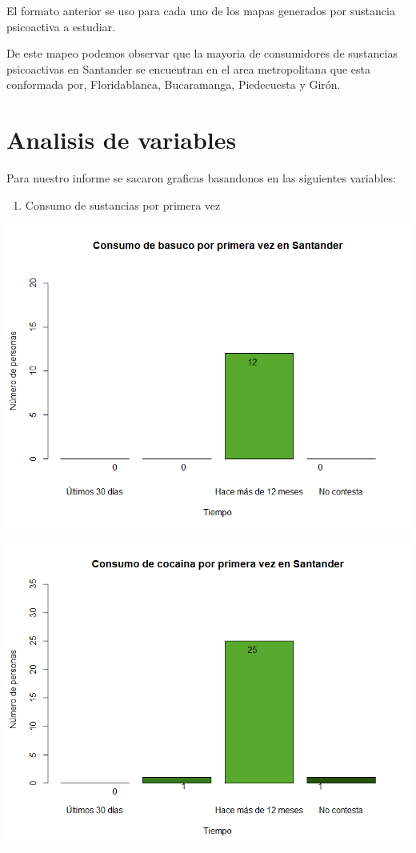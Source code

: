 \documentclass[
]{article}
\providecommand{\tightlist}{%
  \setlength{\itemsep}{0pt}\setlength{\parskip}{0pt}}
\begin{document}
El formato anterior se uso para cada uno de los mapas generados por
sustancia psicoactiva a estudiar.

De este mapeo podemos observar que la mayoria de consumidores de
sustancias psicoactivas en Santander se encuentran en el area
metropolitana que esta conformada por, Floridablanca, Bucaramanga,
Piedecuesta y Girón.

\section{Analisis de variables}\label{analisis-de-variables}

Para nuestro informe se sacaron graficas basandonos en las siguientes
variables:

\begin{enumerate}
\def\labelenumi{\arabic{enumi}.}
\tightlist
\item
  Consumo de sustancias por primera vez
\end{enumerate}

\includegraphics{images/basuco 1 santander.png}

\includegraphics{images/cocaina 1 santander.png}
\end{document}

